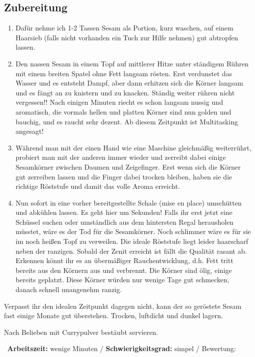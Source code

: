 \begin{minipage}[t]{0.58\textwidth}
\vspace{0pt}
\subsection*{Zubereitung}
\begin{enumerate}[leftmargin=*, itemindent=14pt]

\item Dafür nehme ich 1-2 Tassen Sesam als Portion, kurz waschen, auf einem Haarsieb (falls nicht vorhanden ein Tuch zur Hilfe nehmen) gut abtropfen lassen.

\item Den nassen Sesam in einem Topf auf mittlerer Hitze unter ständigem Rühren mit einem breiten Spatel ohne Fett langsam rösten. Erst verdunstet das Wasser und es entsteht Dampf, aber dann erhitzen sich die Körner langsam und es fängt an zu knistern und zu knacken. Ständig weiter rühren nicht vergessen!! Nach einigen Minuten riecht es schon langsam nussig und aromatisch, die vormals hellen und platten Körner sind nun golden und bauchig, und es raucht sehr dezent. Ab diesem Zeitpunkt ist Multitasking angesagt!

\item Während man mit der einen Hand wie eine Maschine gleichmäßig weiterrührt, probiert man mit der anderen immer wieder und zerreibt dabei einige Sesamkörner zwischen Daumen und Zeigefinger. Erst wenn sich die Körner gut zerreiben lassen und die Finger dabei trocken bleiben, haben sie die richtige Röststufe und damit das volle Aroma erreicht.

\item Nun sofort in eine vorher bereitgestellte Schale (mise en place) umschütten und abkühlen lassen. Es geht hier um Sekunden! Falls ihr erst jetzt eine Schüssel suchen oder umständlich aus dem hintersten Regal herausholen müsstet, wäre es der Tod für die Sesamkörner. Noch schlimmer wäre es für sie im noch heißen Topf zu verweilen. Die ideale Röststufe liegt leider haarscharf neben der ranzigen. Sobald der Zenit erreicht ist fällt die Qualität rasant ab. Erkennen könnt ihr es an übermäßiger Rauchentwicklung, d.h. Fett tritt bereits aus den Körnern aus und verbrennt. Die Körner sind ölig, einige bereits geplatzt. Diese Körner würden nur wenige Tage gut schmecken, danach schnell unangenehm ranzig.
\end{enumerate}

Verpasst ihr den idealen Zeitpunkt dagegen nicht, kann der so geröstete Sesam fast einige Monate gut überstehen. Trocken, luftdicht und dunkel lagern.


Nach Belieben mit Currypulver bestäubt servieren.
\end{minipage}
\vfill
\decothreeright \, \textbf{Arbeitszeit:} wenige Minuten	 / \textbf{Schwierigkeitsgrad:} simpel	 / \decothreeleft \hfill Bewertung: \Circle  \Circle \Circle  \Circle \Circle